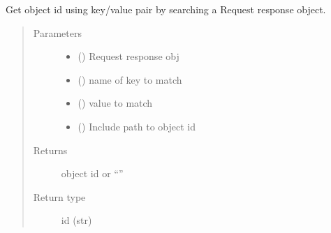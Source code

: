 \documentclass[letterpaper,10pt,english]{sphinxmanual}
\begin{document}
\begin{fulllineitems}
\begin{fulllineitems}
\label{\detokenize{b1cdc-class:bloxone.b1cdc.search_response}}
\sphinxAtStartPar
Get object id using key/value pair by searching a
Request response object.
\begin{quote}\begin{description}
\item[{Parameters}] \leavevmode\begin{itemize}
\item {} 
\sphinxAtStartPar
{} () \textendash{} Request response obj

\item {} 
\sphinxAtStartPar
{} () \textendash{} name of key to match

\item {} 
\sphinxAtStartPar
{} () \textendash{} value to match

\item {} 
\sphinxAtStartPar
{} () \textendash{} Include path to object id

\end{itemize}

\item[{Returns}] \leavevmode
\sphinxAtStartPar
object id or “”

\item[{Return type}] \leavevmode
\sphinxAtStartPar
id (str)

\end{description}\end{quote}

\end{fulllineitems}



\end{fulllineitems}
\end{document}
